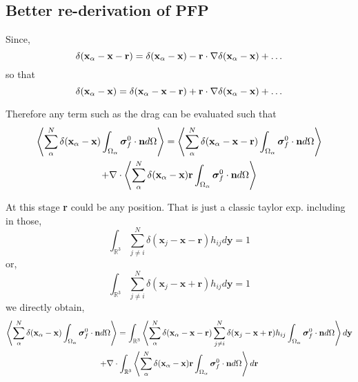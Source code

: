 \documentclass[12pt]{My_preprint}
\begin{document}
\subsection{Better re-derivation of PFP}

Since, 
\begin{equation}
    \delta(\textbf{x}_\alpha - \textbf{x} - \textbf{r})
    = \delta(\textbf{x}_\alpha- \textbf{x} )
    - \textbf{r} \cdot \mathbf{\nabla} \delta(\textbf{x}_\alpha- \textbf{x} )
    + \ldots
\end{equation}
so that
\begin{equation}
    \delta(\textbf{x}_\alpha - \textbf{x} )
    = \delta(\textbf{x}_\alpha - \textbf{x} - \textbf{r})
    + \textbf{r} \cdot \mathbf{\nabla} \delta(\textbf{x}_\alpha- \textbf{x} )
    + \ldots
\end{equation}

Therefore any term such as the drag can be evaluated such that
\begin{multline}
    \left<
        \sum_\alpha^N 
        \delta(\textbf{x}_\alpha - \textbf{x})
        \int_{\Omega_{\alpha}} \bm\sigma_f^0 \cdot \textbf{n} d\Omega
        \right>
    =
    \left<
        \sum_\alpha^N 
        \delta(\textbf{x}_\alpha - \textbf{x} - \textbf{r})
        \int_{\Omega_{\alpha}} \bm\sigma_f^0 \cdot \textbf{n} d\Omega
        \right>\\
    + 
    \mathbf{\nabla}\cdot
    \left<
        \sum_\alpha^N 
        \delta(\textbf{x}_\alpha - \textbf{x})
        \textbf{r}
    \int_{\Omega_{\alpha}} \bm\sigma_f^0 \cdot \textbf{n} d\Omega
    \right>
\end{multline}

At this stage \textbf{r} could be any position. 
That is just a classic taylor exp. 
including in those, 
\begin{equation}
    \int_{\mathbb{R}^3}
    \sum_{j\neq i }^N 
    \delta(\textbf{x}_j - \textbf{x} - \textbf{r})
    h_{ij}
    d\textbf{y}
    = 1
\end{equation}
or, 
\begin{equation}
    \int_{\mathbb{R}^3}
    \sum_{j\neq i }^N 
    \delta(\textbf{x}_j - \textbf{x} + \textbf{r})
    h_{ij}
    d\textbf{y}
    = 1
\end{equation}
we directly obtain, 
\begin{multline}
    \left<
        \sum_\alpha^N 
        \delta(\textbf{x}_\alpha - \textbf{x})
        \int_{\Omega_{\alpha}} \bm\sigma_f^0 \cdot \textbf{n} d\Omega
        \right>
    =
    \int_{\mathbb{R}^3}
    \left<
        \sum_\alpha^N 
        \delta(\textbf{x}_\alpha - \textbf{x} - \textbf{r})
        \sum_{j\neq i }^N 
        \delta(\textbf{x}_j - \textbf{x} + \textbf{r})
        h_{ij}
        \int_{\Omega_{\alpha}} \bm\sigma_f^0 \cdot \textbf{n} d\Omega
    \right>
    d\textbf{y}
    \\
    + 
    \mathbf{\nabla}\cdot
    \int_{\mathbb{R}^3}
    \left<
    \sum_\alpha^N 
    \delta(\textbf{x}_\alpha - \textbf{x})
    \textbf{r}
    \int_{\Omega_{\alpha}} \bm\sigma_f^0 \cdot \textbf{n} d\Omega
    \right>
    d\textbf{r}
\end{multline}
\end{document}
